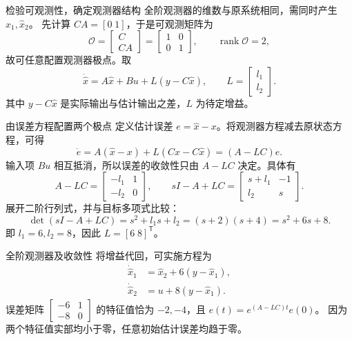 \documentclass[11pt]{article}
\begin{document}
\begin{solution}
\begin{proofstep}{检验可观测性，确定观测器结构}
全阶观测器的维数与原系统相同，需同时产生 $\hat x_1,\hat x_2$。
先计算 $CA=[0\;1]$，于是可观测矩阵为
\[
 \mathcal O=\begin{bmatrix}C\\CA\end{bmatrix}
 =\begin{bmatrix}1&0\\0&1\end{bmatrix},\qquad
 \operatorname{rank}\mathcal O=2,
\]
故可任意配置观测器极点。取
\[
 \dot{\hat x}=A\hat x+Bu+L(y-C\hat x),\qquad
 L=\begin{bmatrix}l_1\\l_2\end{bmatrix}.
\]
其中 $y-C\hat x$ 是实际输出与估计输出之差，$L$ 为待定增益。
\end{proofstep}
\begin{proofstep}{由误差方程配置两个极点}
定义估计误差 $e=\hat x-x$。将观测器方程减去原状态方程，可得
\[
 \dot e=A(\hat x-x)+L(Cx-C\hat x)=(A-LC)e.
\]
输入项 $Bu$ 相互抵消，所以误差的收敛性只由 $A-LC$ 决定。具体有
\[
 A-LC=\begin{bmatrix}-l_1&1\\-l_2&0\end{bmatrix},\qquad
 sI-A+LC=\begin{bmatrix}s+l_1&-1\\l_2&s\end{bmatrix}.
\]
展开二阶行列式，并与目标多项式比较：
\[
 \det(sI-A+LC)=s^2+l_1s+l_2
 =(s+2)(s+4)=s^2+6s+8.
\]
即 $l_1=6,l_2=8$，因此 $L=[6\;8]^{\mathsf T}$。
\end{proofstep}
\begin{proofresult}{全阶观测器及收敛性}
将增益代回，可实施方程为
\[
 \boxed{\begin{aligned}
  \dot{\hat x}_1&=\hat x_2+6(y-\hat x_1),\\
  \dot{\hat x}_2&=u+8(y-\hat x_1).
 \end{aligned}}
\]
误差矩阵 $\begin{bmatrix}-6&1\\-8&0\end{bmatrix}$ 的特征值恰为
$-2,-4$，且 $e(t)=e^{(A-LC)t}e(0)$。
因为两个特征值实部均小于零，任意初始估计误差均趋于零。
\end{proofresult}
\end{solution}
\end{document}
